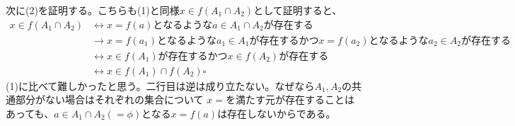 \documentclass[a4j,dvipdfmx]{jsarticle}
\begin{document}
\newpage
次に(2)を証明する。こちらも(1)と同様$x\in f(A_1\cap A_2)$として証明すると、
\begin{align*}
    x\in f(A_1\cap A_2)
    &\leftrightarrow x=f(a)となるような a\in A_1\cap A_2が存在する\\
    &\rightarrow x=f(a_1)となるようなa_1\in A_1が存在するかつ x=f(a_2)となるようなa_2\in A_2が存在する\\
    &\leftrightarrow x\in f(A_1)が存在するかつx\in f(A_2)が存在する\\
    &\leftrightarrow x\in f(A_1)\cap f(A_2)\square
\end{align*}
(1)に比べて難しかったと思う。二行目は逆は成り立たない。なぜなら$A_1,A_2$の共通部分がない場合はそれぞれの集合について
$x=$を満たす元が存在することはあっても、$a\in A_1\cap A_2(=\phi)$となる$x=f(a)$は存在しないからである。
\end{document}
